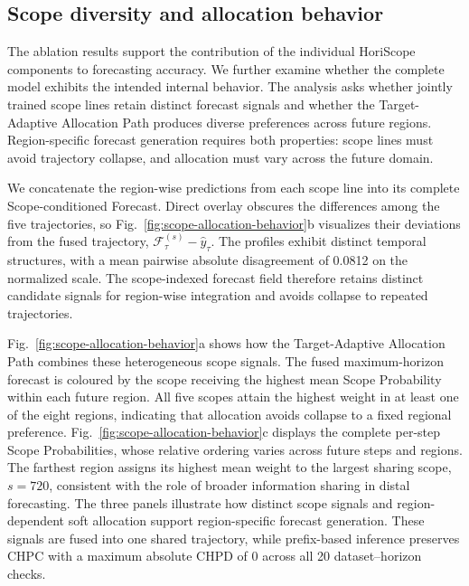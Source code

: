 \subsection{Scope diversity and allocation behavior}
\label{sec:scope-behavior}


The ablation results support the contribution of the individual HoriScope components to forecasting accuracy. We further examine whether the complete model exhibits the intended internal behavior. The analysis asks whether jointly trained scope lines retain distinct forecast signals and whether the Target-Adaptive Allocation Path produces diverse preferences across future regions. Region-specific forecast generation requires both properties: scope lines must avoid trajectory collapse, and allocation must vary across the future domain.

We concatenate the region-wise predictions from each scope line into its complete Scope-conditioned Forecast. Direct overlay obscures the differences among the five trajectories, so Fig.~\ref{fig:scope-allocation-behavior}b visualizes their deviations from the fused trajectory, $\mathcal F_\tau^{(s)}-\widehat y_\tau$. The profiles exhibit distinct temporal structures, with a mean pairwise absolute disagreement of 0.0812 on the normalized scale. The scope-indexed forecast field therefore retains distinct candidate signals for region-wise integration and avoids collapse to repeated trajectories.

Fig.~\ref{fig:scope-allocation-behavior}a shows how the Target-Adaptive Allocation Path combines these heterogeneous scope signals. The fused maximum-horizon forecast is coloured by the scope receiving the highest mean Scope Probability within each future region. All five scopes attain the highest weight in at least one of the eight regions, indicating that allocation avoids collapse to a fixed regional preference. Fig.~\ref{fig:scope-allocation-behavior}c displays the complete per-step Scope Probabilities, whose relative ordering varies across future steps and regions. The farthest region assigns its highest mean weight to the largest sharing scope, $s=720$, consistent with the role of broader information sharing in distal forecasting. The three panels illustrate how distinct scope signals and region-dependent soft allocation support region-specific forecast generation. These signals are fused into one shared trajectory, while prefix-based inference preserves CHPC with a maximum absolute CHPD of 0 across all 20 dataset--horizon checks.



